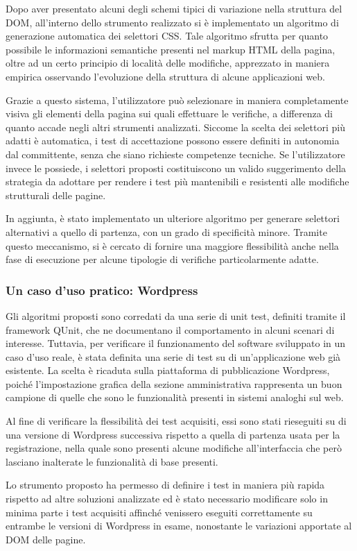 \documentclass[a4paper,12pt]{article}
\begin{document}
Dopo aver presentato alcuni degli schemi tipici di variazione nella struttura del DOM, all'interno dello strumento realizzato si è implementato un algoritmo di generazione automatica dei selettori CSS. Tale algoritmo sfrutta per quanto possibile le informazioni semantiche presenti nel markup HTML della pagina, oltre ad un certo principio di località delle modifiche, apprezzato in maniera empirica osservando l'evoluzione della struttura di alcune applicazioni web.

Grazie a questo sistema, l'utilizzatore può selezionare in maniera completamente visiva gli elementi della pagina sui quali effettuare le verifiche, a differenza di quanto accade negli altri strumenti analizzati. Siccome la scelta dei selettori più adatti è automatica, i test di accettazione possono essere definiti in autonomia dal committente, senza che siano richieste competenze tecniche. Se l'utilizzatore invece le possiede, i selettori proposti costituiscono un valido suggerimento della strategia da adottare per rendere i test più mantenibili e resistenti alle modifiche strutturali delle pagine.  

In aggiunta, è stato implementato un ulteriore algoritmo per generare selettori alternativi a quello di partenza, con un grado di specificità minore. Tramite questo meccanismo, si è cercato di fornire una maggiore flessibilità anche nella fase di esecuzione per alcune tipologie di verifiche particolarmente adatte.

\subsubsection*{Un caso d'uso pratico: Wordpress}

Gli algoritmi proposti sono corredati da una serie di unit test, definiti tramite il framework QUnit, che ne documentano il comportamento in alcuni scenari di interesse. Tuttavia, per verificare il funzionamento del software sviluppato in un caso d'uso reale, è stata definita una serie di test su di un'applicazione web già esistente. La scelta è ricaduta sulla piattaforma di pubblicazione Wordpress, poiché l'impostazione grafica della sezione amministrativa rappresenta un buon campione di quelle che sono le funzionalità presenti in sistemi analoghi sul web.

Al fine di verificare la flessibilità dei test acquisiti, essi sono stati rieseguiti su di una versione di Wordpress successiva rispetto a quella di partenza usata per la registrazione, nella quale sono presenti alcune modifiche all'interfaccia che però lasciano inalterate le funzionalità di base presenti. 

Lo strumento proposto ha permesso di definire i test in maniera più rapida rispetto ad altre soluzioni analizzate ed è stato necessario modificare solo in minima parte i test acquisiti affinché venissero eseguiti correttamente su entrambe le versioni di Wordpress in esame, nonostante le variazioni apportate al DOM delle pagine.
\end{document}
